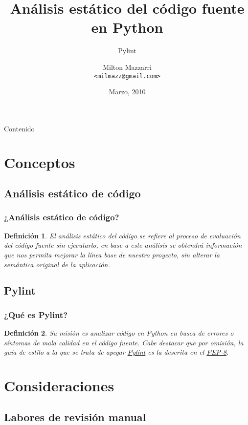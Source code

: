 \documentclass{beamer}
\title{Análisis estático del código fuente en Python}
\subtitle{Pylint}
\author[Milton Mazzarri]{Milton Mazzarri \\
\texttt{<milmazz@gmail.com>} \\
}
\date{Marzo, 2010}
\newtheorem{definicion}{Definición}
\begin{document}
\begin{frame}
    \titlepage
\end{frame}

\begin{frame}[allowframebreaks]{Contenido}
    \tableofcontents
\end{frame}

\section{Conceptos}

\subsection{Análisis estático de código}

\begin{frame}
    \frametitle{¿Análisis estático de código?}

    \begin{definicion}
    El análisis estático del código se refiere al proceso de evaluación del
    código fuente sin ejecutarlo, en base a este análisis se obtendrá
    información que nos permita mejorar la línea base de nuestro proyecto,
    sin alterar la semántica original de la aplicación.
    \end{definicion}
\end{frame}

\subsection{Pylint}

\begin{frame}
    \frametitle{¿Qué es Pylint?}

    \begin{definicion}
    Su misión es analizar código en Python en busca de errores o síntomas de
    mala calidad en el código fuente. Cabe destacar que por omisión, la guía de
    estilo a la que se trata de apegar
    \href{http://www.logilab.org/project/pylint}{Pylint} es la descrita en
    el \href{http://www.python.org/dev/peps/pep-0008/}{PEP-8}.
    \end{definicion}
\end{frame}

\section{Consideraciones}

\subsection{Labores de revisión manual}
\end{document}

